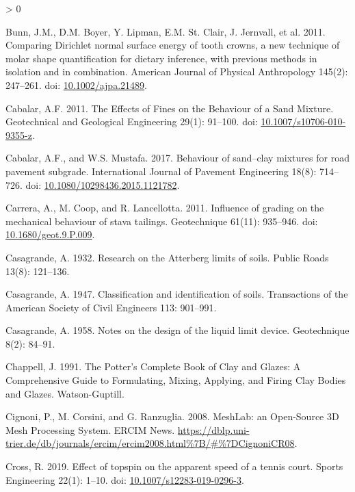 \documentclass[
  letterpaper,
  openany]{book}
\newlength{\cslhangindent}
\newenvironment{CSLReferences}[2] %
 {%
  \setlength{\parindent}{0pt}
  \ifodd #1 \everypar{\setlength{\hangindent}{\cslhangindent}}\ignorespaces\fi
  \ifnum #2 > 0
  \setlength{\parskip}{#2\baselineskip}
  \fi
 }%
 {}
\begin{document}
\begin{CSLReferences}{1}{0}
\leavevmode\hypertarget{ref-Bunn2011}{}%
Bunn, J.M., D.M. Boyer, Y. Lipman, E.M. St. Clair, J. Jernvall, et al. 2011. {Comparing Dirichlet normal surface energy of tooth crowns, a new technique of molar shape quantification for dietary inference, with previous methods in isolation and in combination}. American Journal of Physical Anthropology 145(2): 247--261. doi: \href{https://doi.org/10.1002/ajpa.21489}{10.1002/ajpa.21489}.

\leavevmode\hypertarget{ref-Cabalar2011}{}%
Cabalar, A.F. 2011. {The Effects of Fines on the Behaviour of a Sand Mixture}. Geotechnical and Geological Engineering 29(1): 91--100. doi: \href{https://doi.org/10.1007/s10706-010-9355-z}{10.1007/s10706-010-9355-z}.

\leavevmode\hypertarget{ref-Cabalar2017}{}%
Cabalar, A.F., and W.S. Mustafa. 2017. {Behaviour of sand--clay mixtures for road pavement subgrade}. International Journal of Pavement Engineering 18(8): 714--726. doi: \href{https://doi.org/10.1080/10298436.2015.1121782}{10.1080/10298436.2015.1121782}.

\leavevmode\hypertarget{ref-Carrera2011}{}%
Carrera, A., M. Coop, and R. Lancellotta. 2011. {Influence of grading on the mechanical behaviour of stava tailings}. Geotechnique 61(11): 935--946. doi: \href{https://doi.org/10.1680/geot.9.P.009}{10.1680/geot.9.P.009}.

\leavevmode\hypertarget{ref-Casagrande1932}{}%
Casagrande, A. 1932. {Research on the Atterberg limits of soils}. Public Roads 13(8): 121--136.

\leavevmode\hypertarget{ref-Casagrande1947}{}%
Casagrande, A. 1947. {Classification and identification of soils}. Transactions of the American Society of Civil Engineers 113: 901--991.

\leavevmode\hypertarget{ref-Casagrande1958}{}%
Casagrande, A. 1958. {Notes on the design of the liquid limit device}. Geotechnique 8(2): 84--91.

\leavevmode\hypertarget{ref-Chappell1991}{}%
Chappell, J. 1991. {The Potter's Complete Book of Clay and Glazes: A Comprehensive Guide to Formulating, Mixing, Applying, and Firing Clay Bodies and Glazes}. Watson-Guptill.

\leavevmode\hypertarget{ref-Cignoni2008}{}%
Cignoni, P., M. Corsini, and G. Ranzuglia. 2008. {MeshLab: an Open-Source 3D Mesh Processing System}. ERCIM News. \url{https://dblp.uni-trier.de/db/journals/ercim/ercim2008.html\%7B/\#\%7DCignoniCR08}.

\leavevmode\hypertarget{ref-Cross2019}{}%
Cross, R. 2019. {Effect of topspin on the apparent speed of a tennis court}. Sports Engineering 22(1): 1--10. doi: \href{https://doi.org/10.1007/s12283-019-0296-3}{10.1007/s12283-019-0296-3}.


\end{CSLReferences}
\end{document}
